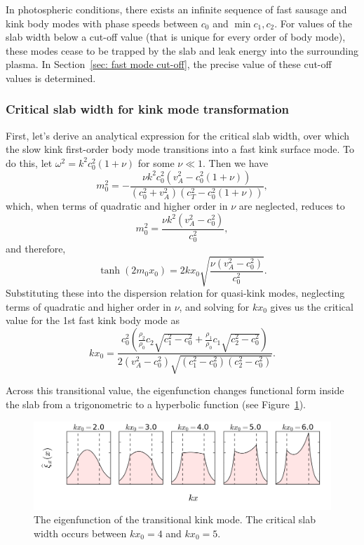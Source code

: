 \documentclass[12pt]{../style-files/ociamthesis}
\begin{document}
In photospheric conditions, there exists an infinite sequence of fast sausage and kink body modes with phase speeds between $c_0$ and $\min{c_1, c_2}$. For values of the slab width below a cut-off value (that is unique for every order of body mode), these modes cease to be trapped by the slab and leak energy into the surrounding plasma. In Section~\ref{sec: fast mode cut-off}, the precise value of these cut-off values is determined.


\subsubsection{Critical slab width for kink mode transformation} \label{sec: critical slab width}
First, let's derive an analytical expression for the critical slab width, over which the slow kink first-order body mode transitions into a fast kink surface mode. To do this, let $\omega^2 = k^2c_0^2(1 + \nu)$ for some $\nu \ll 1$. Then we have
\begin{equation}
m_0^2 = -\frac{\nu k^2c_0^2(v_A^2 - c_0^2(1 + \nu))}{(c_0^2 + v_A^2)(c_T^2 - c_0^2(1 + \nu))},
\end{equation}
which, when terms of quadratic and higher order in $\nu$ are neglected, reduces to
\begin{equation}
m_0^2 = \frac{\nu k^2(v_A^2 - c_0^2)}{c_0^2},
\end{equation}
and therefore,
\begin{equation}
\tanh(2m_0x_0) = 2kx_0\sqrt{\frac{\nu(v_A^2 - c_0^2)}{c_0^2}}.
\end{equation}
Substituting these into the dispersion relation for quasi-kink modes, neglecting terms of quadratic and higher order in $\nu$, and solving for $kx_0$ gives us the critical value for the 1st fast kink body mode as
\begin{equation}
kx_0 = \frac{c_0^2 \left(\frac{\rho_2}{\rho_0}c_2\sqrt{c_1^2 - c_0^2} + \frac{\rho_1}{\rho_0}c_1\sqrt{c_2^2 - c_0^2}\right)}{2(v_A^2 - c_0^2)\sqrt{(c_1^2 - c_0^2)(c_2^2 - c_0^2)}}.
\end{equation}

Across this transitional value, the eigenfunction changes functional form inside the slab from a trigonometric to a hyperbolic function (see Figure~\ref{fig: transitional kink eigenfunction}). 
\begin{figure}
	\centering
	\includegraphics[width=\textwidth]{../main/figures/xi_of_x_body_surface_conversion.png}
	\caption{The eigenfunction of the transitional kink mode. The critical slab width occurs between $kx_0 = 4$ and $kx_0 = 5$.}
	\label{fig: transitional kink eigenfunction}
\end{figure}
\end{document}
